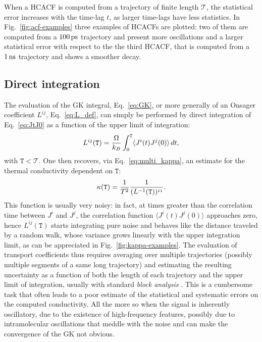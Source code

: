\begin{LEtext}
When a HCACF is computed from a trajectory of finite length $\mathcal{T}$, the statistical error increases with the time-lag $t$, as larger time-lags have less statistics. In Fig.~\ref{fig:acf-examples} three examples of HCACFs are plotted: two of them are computed from a $100\,\mathrm{ps}$ trajectory and present more oscillations and a larger statistical error with respect to the the third HCACF, that is computed from a $1\,\mathrm{ns}$ trajectory and shows a smoother decay.


\subsection{Direct integration}  \label{sec:direct-integration}
The evaluation of the GK integral, Eq.~\eqref{eq:GK}, or more generally of an Onsager coefficient $L^{ij}$, Eq.~\eqref{eq:L_def}, can simply be performed by direct integration of Eq.~\eqref{eq:JtJ0} as a function of the upper limit of integration: 
\begin{equation}
    L^{ij}(\mathtt{T}) = \frac{\rOmega}{k_B} \int_0^{\mathtt{T}} \langle J^i(t)J^j(0)\rangle \,dt ,  \label{eq:Lij-integralT}
\end{equation}
with $\mathtt{T} < \mathcal{T}$. 
One then recovers, via Eq.~\eqref{eq:multi_kappa}, an estimate for the thermal conductivity dependent on $\mathtt{T}$:
\begin{equation}
    \kappa(\mathtt{T}) = \frac{1}{T^2} \frac{1}{(L^{-1}(\mathtt{T}))^{\smallone\smallone}}.  \label{eq:kappa-integralT}
\end{equation}
This function is usually very noisy: in fact, at times greater than the correlation time between $J^i$ and $J^j$, the correlation function $\langle J^i(t)J^j(0)\rangle$ approaches zero, hence $L^{ij}(\mathtt{T})$ starts integrating pure noise and behaves like the distance traveled by a random walk, whose variance grows linearly with the upper integration limit, as can be appreciated in Fig.~\ref{fig:kappa-examples}.
The evaluation of transport coefficients thus requires averaging over multiple trajectories (possibly multiple segments of a same long trajectory) and estimating the resulting uncertainty as a function of both the length of each trajectory and the upper limit of integration, usually with standard \emph{block analysis} \cite{Frenkel2001}. This is a cumbersome task that often leads to a poor estimate of the statistical and systematic errors on the computed conductivity. All the more so when the signal is inherently oscillatory, due to the existence of high-frequency features, possibly due to intramolecular oscillations that meddle with the noise and can make the convergence of the GK not obvious.


\end{LEtext}
